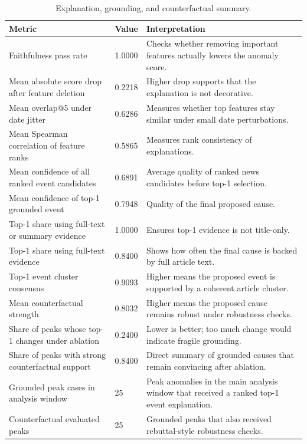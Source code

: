 \documentclass[11pt,a4paper,twoside]{article}
\begin{document}
\begin{table}[H]
    \centering
    \scriptsize
    \setlength{\tabcolsep}{4pt}
    \renewcommand{\arraystretch}{1.12}
    \begin{tabularx}{\linewidth}{p{4.2cm} p{1.4cm} Y}
    \toprule
    \textbf{Metric} & \textbf{Value} & \textbf{Interpretation} \\
    \midrule
    Faithfulness pass rate & 1.0000 & Checks whether removing important features actually lowers the anomaly score. \\
    Mean absolute score drop after feature deletion & 0.2218 & Higher drop supports that the explanation is not decorative. \\
    Mean overlap@5 under date jitter & 0.6286 & Measures whether top features stay similar under small date perturbations. \\
    Mean Spearman correlation of feature ranks & 0.5865 & Measures rank consistency of explanations. \\
    Mean confidence of all ranked event candidates & 0.6891 & Average quality of ranked news candidates before top-1 selection. \\
    Mean confidence of top-1 grounded event & 0.7948 & Quality of the final proposed cause. \\
    Top-1 share using full-text or summary evidence & 1.0000 & Ensures top-1 evidence is not title-only. \\
    Top-1 share using full-text evidence & 0.8400 & Shows how often the final cause is backed by full article text. \\
    Top-1 event cluster consensus & 0.9093 & Higher means the proposed event is supported by a coherent article cluster. \\
    Mean counterfactual strength & 0.8032 & Higher means the proposed cause remains robust under robustness checks. \\
    Share of peaks whose top-1 changes under ablation & 0.2400 & Lower is better; too much change would indicate fragile grounding. \\
    Share of peaks with strong counterfactual support & 0.8400 & Direct summary of grounded causes that remain convincing after ablation. \\
    Grounded peak cases in analysis window & 25 & Peak anomalies in the main analysis window that received a ranked top-1 event explanation. \\
    Counterfactual evaluated peaks & 25 & Grounded peaks that also received rebuttal-style robustness checks. \\
    \bottomrule
    \end{tabularx}
    \caption{Explanation, grounding, and counterfactual summary.}
    \label{tab:explanation_grounding_counterfactual_summary}
\end{table}
\end{document}
